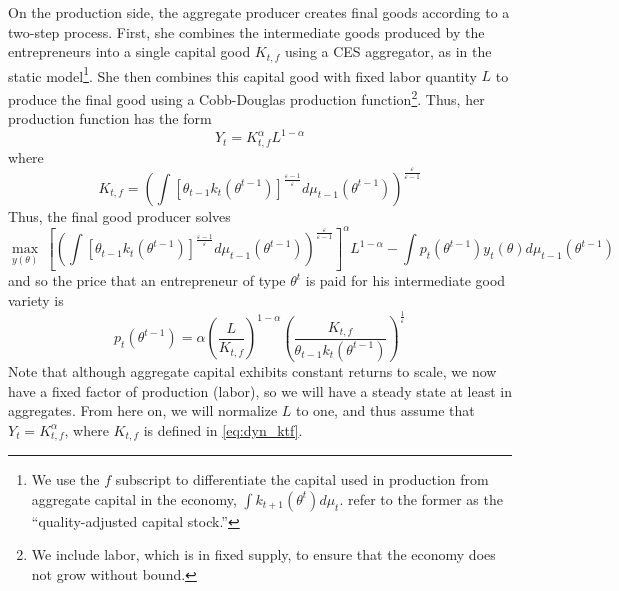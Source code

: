 \documentclass[11pt]{article}
\begin{document}
On the production side, the aggregate producer creates final goods
according to a two-step process. First, she combines the intermediate
goods produced by the entrepreneurs into a single capital good $K_{t,f}$
using a CES aggregator, as in the static model\footnote{We use the \( f \) subscript to differentiate the capital used in production from aggregate capital in the economy, \( \int k_{t+1}\left( \theta^t \right)d\mu_t \). \cite{guvenen2019use} refer to the former as the ``quality-adjusted capital stock.''}. She then combines
this capital good with fixed labor quantity $L$ to produce the final
good using a Cobb-Douglas production function\footnote{We include labor, which is in fixed supply, to ensure that the economy does not grow without bound.}. Thus, her production
function has the form 
\begin{equation}
Y_{t}=K_{t,f}^{\alpha}L^{1-\alpha}
\end{equation}
where 
\begin{equation}
K_{t,f}=\left(\int\left[\theta_{t-1}k_{t}\left(\theta^{t-1}\right)\right]^{\frac{\varepsilon-1}{\varepsilon}}d\mu_{t-1}\left(\theta^{t-1}\right)\right)^{\frac{\varepsilon}{\varepsilon-1}} \label{eq:dyn_ktf}
\end{equation}
Thus, the final good producer solves 
\begin{equation}
\max_{y\left(\theta\right)}\ \left[\left(\int\left[\theta_{t-1}k_{t}\left(\theta^{t-1}\right)\right]^{\frac{\varepsilon-1}{\varepsilon}}d\mu_{t-1}\left(\theta^{t-1}\right)\right)^{\frac{\varepsilon}{\varepsilon-1}}\right]^{\alpha}L^{1-\alpha}-\int p_{t}\left(\theta^{t-1}\right)y_{t}\left(\theta\right)d\mu_{t-1}\left(\theta^{t-1}\right)
\end{equation}
and so the price that an entrepreneur of type \( \theta^t \) is paid for his intermediate good variety is 
\begin{equation}
p_{t}\left(\theta^{t-1}\right)=\alpha\left(\frac{L}{K_{t,f}}\right)^{1-\alpha}\left(\frac{K_{t,f}}{\theta_{t-1}k_{t}\left(\theta^{t-1}\right)}\right)^{\frac{1}{\varepsilon}} \label{eq:dyn_pt}
\end{equation}
Note that although aggregate capital exhibits constant returns to
scale, we now have a fixed factor of production (labor), so we will
have a steady state at least in aggregates. From here on, we will normalize \( L \) to one, and thus assume that \( Y_t = K_{t,f}^\alpha \), where \( K_{t,f} \) is defined in \eqref{eq:dyn_ktf}. 
\end{document}
